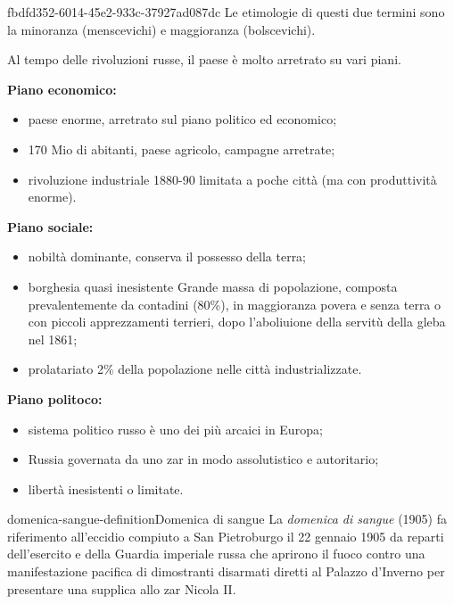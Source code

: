 \documentclass[preview]{standalone}
\begin{document}
\begin{snippet}{fbdfd352-6014-45e2-933c-37927ad087dc}
    Le etimologie di questi due termini sono la minoranza (menscevichi)
    e maggioranza (bolscevichi).
    
    Al tempo delle rivoluzioni russe, il paese è molto arretrato su vari piani.
    
    \textbf{Piano economico:}
    \begin{itemize}
        \item paese enorme, arretrato sul piano politico ed economico;
        \item 170 Mio di abitanti, paese agricolo, campagne arretrate;
        \item rivoluzione industriale 1880-90 limitata a poche città (ma con produttività enorme). 
    \end{itemize}
    
    \textbf{Piano sociale:}
    \begin{itemize}
        \item nobiltà dominante, conserva il possesso della terra;
        \item borghesia quasi inesistente
        Grande massa di popolazione, composta prevalentemente da contadini (80\%),
        in maggioranza povera e senza terra o con piccoli apprezzamenti terrieri, dopo l'aboliuione della servitù
        della gleba nel 1861;
        \item prolatariato 2\% della popolazione nelle città industrializzate.
    \end{itemize}
    
    \textbf{Piano politoco:}
    \begin{itemize}
        \item sistema politico russo è uno dei più arcaici in Europa;
        \item Russia governata da uno zar in modo assolutistico e autoritario;
        \item libertà inesistenti o limitate.
    \end{itemize}
\end{snippet}

\begin{snippetdefinition}{domenica-sangue-definition}{Domenica di sangue}
    La \textit{domenica di sangue} (1905) fa riferimento all'eccidio compiuto a San Pietroburgo
    il 22 gennaio 1905 da reparti dell'esercito e della Guardia imperiale russa
    che aprirono il fuoco contro una manifestazione pacifica di dimostranti disarmati
    diretti al Palazzo d'Inverno per presentare una supplica allo zar Nicola II. 
\end{snippetdefinition}
\end{document}
